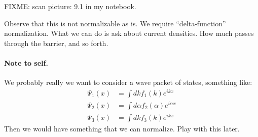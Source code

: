 {FIXME: scan picture: 9.1 in my notebook.

Observe that this is not normalizable as is.  We require ``delta-function'' normalization.  What we can do is ask about current densities.  How much passes through the barrier, and so forth.

%
\paragraph{Note to self.}
We probably really we want to consider a wave packet of states, something like:
%
\begin{equation}\label{eqn:lecture9boundStates:340}
\begin{aligned}
\Psi_1(x) &= \int dk f_1(k) e^{i k x} \\
\Psi_2(x) &= \int d\alpha f_2(\alpha) e^{i \alpha x} \\
\Psi_3(x) &= \int dk f_3(k) e^{i k x}
\end{aligned}
\end{equation}
%
Then we would have something that we can normalize.  Play with this later.

} %
